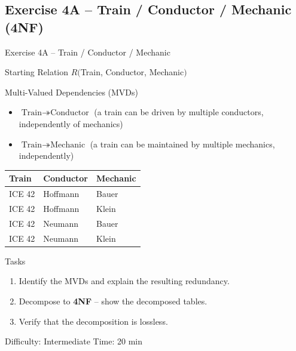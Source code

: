 \documentclass[10pt]{beamer}
\begin{document}
\subsection{Exercise 4A -- Train / Conductor / Mechanic (4NF)}

\begin{frame}{Exercise 4A -- Train / Conductor / Mechanic}
  \begin{block}{Starting Relation}
    $R($Train, Conductor, Mechanic$)$
  \end{block}

  \begin{block}{Multi-Valued Dependencies (MVDs)}
    \begin{itemize}
      \item $\text{Train} \twoheadrightarrow \text{Conductor}$ \quad (a train can be driven by multiple conductors, independently of mechanics)
      \item $\text{Train} \twoheadrightarrow \text{Mechanic}$ \quad (a train can be maintained by multiple mechanics, independently)
    \end{itemize}
  \end{block}

  \small
  \begin{tabular}{|l|l|l|}
    \hline
    \textbf{Train} & \textbf{Conductor} & \textbf{Mechanic} \\
    \hline
    ICE 42 & Hoffmann & Bauer \\
    ICE 42 & Hoffmann & Klein \\
    ICE 42 & Neumann  & Bauer \\
    ICE 42 & Neumann  & Klein \\
    \hline
  \end{tabular}

  \vspace{6pt}
  \begin{block}{Tasks}
    \begin{enumerate}
      \item Identify the MVDs and explain the resulting redundancy.
      \item Decompose to \textbf{4NF} -- show the decomposed tables.
      \item Verify that the decomposition is lossless.
    \end{enumerate}
  \end{block}

  \begin{alertblock}{Difficulty: Intermediate \quad Time: 20 min}
  \end{alertblock}
\end{frame}
\end{document}
